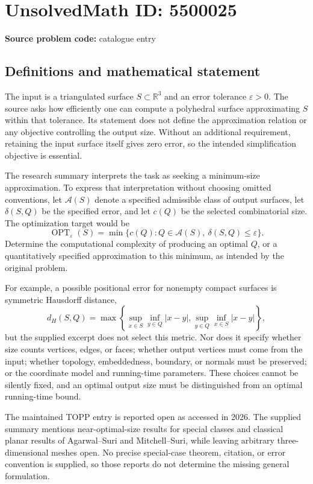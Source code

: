 \documentclass[11pt]{article}
\begin{document}
\section*{UnsolvedMath ID: 5500025}
\textbf{Source problem code:} catalogue entry
\subsection{Definitions and mathematical statement}
The input is a triangulated surface \(S\subset\mathbb R^3\) and an error tolerance \(\varepsilon>0\). The source asks how efficiently one can compute a polyhedral surface approximating \(S\) within that tolerance. Its statement does not define the approximation relation or any objective controlling the output size. Without an additional requirement, retaining the input surface itself gives zero error, so the intended simplification objective is essential.

The research summary interprets the task as seeking a minimum-size approximation. To express that interpretation without choosing omitted conventions, let \(\mathcal A(S)\) denote a specified admissible class of output surfaces, let \(\delta(S,Q)\) be the specified error, and let \(c(Q)\) be the selected combinatorial size. The optimization target would be
\[
 \operatorname{OPT}_\varepsilon(S)=
 \min\{c(Q):Q\in\mathcal A(S),\ \delta(S,Q)\le\varepsilon\}.
\]
Determine the computational complexity of producing an optimal \(Q\), or a quantitatively specified approximation to this minimum, as intended by the original problem.

For example, a possible positional error for nonempty compact surfaces is symmetric Hausdorff distance,
\[
 d_H(S,Q)=\max\left\{\sup_{x\in S}\inf_{y\in Q}|x-y|,
 \sup_{y\in Q}\inf_{x\in S}|x-y|\right\},
\]
but the supplied excerpt does not select this metric. Nor does it specify whether size counts vertices, edges, or faces; whether output vertices must come from the input; whether topology, embeddedness, boundary, or normals must be preserved; or the coordinate model and running-time parameters. These choices cannot be silently fixed, and an optimal output size must be distinguished from an optimal running-time bound.

The maintained TOPP entry is reported open as accessed in 2026. The supplied summary mentions near-optimal-size results for special classes and classical planar results of Agarwal--Suri and Mitchell--Suri, while leaving arbitrary three-dimensional meshes open. No precise special-case theorem, citation, or error convention is supplied, so those reports do not determine the missing general formulation.
\end{document}
